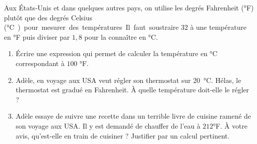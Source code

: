 
\begin{exercice}\label{exosmath-0821}

Aux États-Unis et dans quelques autres pays, on utilise les degrés Fahrenheit (°F) plutôt que des degrés Celsius (\si\degreeCelsius) pour mesurer des températures. Il faut soustraire $32$ à une température en °F puis diviser par $1,8$ pour la connaître en °C.  

\begin{enumerate}
    \item
        Écrire une expression qui permet de calculer la température en °C correspondant à \( 100 \) °F.
    \item
        Adèle, en voyage aux USA veut régler son thermostat sur \SI{20}{\degreeCelsius}. Hélas, le thermostat est gradué en Fahrenheit. À quelle température doit-elle le régler ?
    \item
        Adèle essaye de suivre une recette dans un terrible livre de cuisine ramené de son voyage aux USA. Il y est demandé de chauffer de l'eau à \( 212\)°F. À votre avis, qu'est-elle en train de cuisiner ? Justifier par un calcul pertinent.
\end{enumerate}

\end{exercice}
